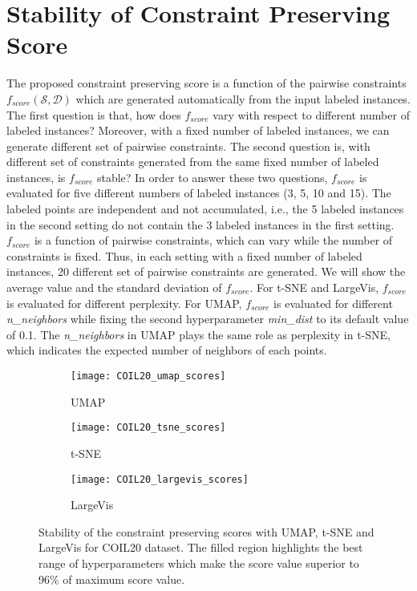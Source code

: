 \section{Stability of Constraint Preserving Score}\label{sec:result:stability}

The proposed constraint preserving score is a function of the pairwise constraints $f_{score}(\mathcal{S}, \mathcal{D})$ which are generated automatically from the input labeled instances.
The first question is that, how does $f_{score}$ vary with respect to different number of labeled instances?
Moreover, with a fixed number of labeled instances, we can generate different set of pairwise constraints.
The second question is, with different set of constraints generated from the same fixed number of labeled instances, is $f_{score}$ stable?
In order to answer these two questions, $f_{score}$ is evaluated for five different numbers of labeled instances (3, 5, 10 and 15).
The labeled points are independent and not accumulated, i.e., the 5 labeled instances in the second setting do not contain the 3 labeled instances in the first setting.
$f_{score}$ is a function of pairwise constraints, which can vary while the number of constraints is fixed.
Thus, in each setting with a fixed number of labeled instances, 20 different set of pairwise constraints are generated.
We will show the average value and the standard deviation of $f_{score}$.
For t-SNE and LargeVis, $f_{score}$ is evaluated for different perplexity.
For UMAP, $f_{score}$ is evaluated for different \emph{n\_neighbors} while fixing the second hyperparameter \emph{min\_dist} to its default value of 0.1.
The \emph{n\_neighbors} in UMAP plays the same role as perplexity in t-SNE, which indicates the expected number of neighbors of each points.

\begin{figure}%
\begin{subfigure}[b]{0.3\linewidth}
     \centering
     \texttt{[image: COIL20\_umap\_scores]}
     \caption{UMAP}
\end{subfigure}
\hfill
\begin{subfigure}[b]{0.3\linewidth}
     \centering
     \texttt{[image: COIL20\_tsne\_scores]}
     \caption{t-SNE}
\end{subfigure}
\hfill
\begin{subfigure}[b]{0.3\linewidth}
     \centering
     \texttt{[image: COIL20\_largevis\_scores]}
     \caption{LargeVis}
\end{subfigure}
\caption{Stability of the constraint preserving scores with UMAP, t-SNE and LargeVis for COIL20 dataset.
The filled region highlights the best range of hyperparameters which make the score value superior to 96\% of maximum score value.}
\label{fig:score:stability:COIL20}
\end{figure}

